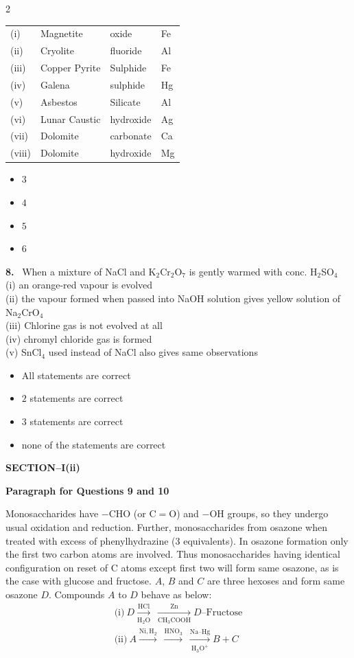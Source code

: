 \documentclass[10pt]{extarticle}
\newcommand{\sect}[1]{\par\smallskip\noindent\textbf{#1}\par}
\newcommand{\qn}[1]{\par\smallskip\noindent\textbf{#1.}~}
\newcommand{\paraq}[2]{\par\smallskip\noindent\textbf{Paragraph for Questions #1 and #2}\par}
\newenvironment{qoptions}{\begin{itemize}[leftmargin=1.8em,itemsep=1pt,topsep=2pt,label={}]}{\end{itemize}}
\newcommand{\opt}[2]{\item[(#1)] #2}
\begin{document}
\begin{multicols}{2}
\begin{center}\small
\begin{tabular}{@{}llll@{}}
(i) & Magnetite & oxide & Fe\\
(ii) & Cryolite & fluoride & Al\\
(iii) & Copper Pyrite & Sulphide & Fe\\
(iv) & Galena & sulphide & Hg\\
(v) & Asbestos & Silicate & Al\\
(vi) & Lunar Caustic & hydroxide & Ag\\
(vii) & Dolomite & carbonate & Ca\\
(viii) & Dolomite & hydroxide & Mg
\end{tabular}
\end{center}
\begin{qoptions}
\opt{A}{$3$}
\opt{B}{$4$}
\opt{C}{$5$}
\opt{D}{$6$}
\end{qoptions}
\qn{8} When a mixture of NaCl and K$_2$Cr$_2$O$_7$ is gently warmed with conc. H$_2$SO$_4$\\
(i) an orange-red vapour is evolved\\
(ii) the vapour formed when passed into NaOH solution gives yellow solution of Na$_2$CrO$_4$\\
(iii) Chlorine gas is not evolved at all\\
(iv) chromyl chloride gas is formed\\
(v) SnCl$_4$ used instead of NaCl also gives same observations
\begin{qoptions}
\opt{A}{All statements are correct}
\opt{B}{$2$ statements are correct}
\opt{C}{$3$ statements are correct}
\opt{D}{none of the statements are correct}
\end{qoptions}
\sect{SECTION--I(ii)}
\paraq{9}{10}
Monosaccharides have $-$CHO (or $\mathrm{C=O}$) and $-$OH groups, so they undergo usual oxidation and reduction. Further, monosaccharides from osazone when treated with excess of phenylhydrazine ($3$ equivalents). In osazone formation only the first two carbon atoms are involved. Thus monosaccharides having identical configuration on reset of C atoms except first two will form same osazone, as is the case with glucose and fructose. $A$, $B$ and $C$ are three hexoses and form same osazone $D$. Compounds $A$ to $D$ behave as below:
\begin{gather*}
\text{(i)}\ D\xrightarrow[\mathrm{H_2O}]{\mathrm{HCl}}\ \xrightarrow[\mathrm{CH_3COOH}]{\mathrm{Zn}}D\text{--Fructose}\\
\text{(ii)}\ A\xrightarrow{\mathrm{Ni,H_2}}\ \xrightarrow{\mathrm{HNO_3}}\ \xrightarrow[\mathrm{H_3O^+}]{\mathrm{Na\text{--}Hg}}B+C\\

\end{gather*}
\end{multicols}
\end{document}
